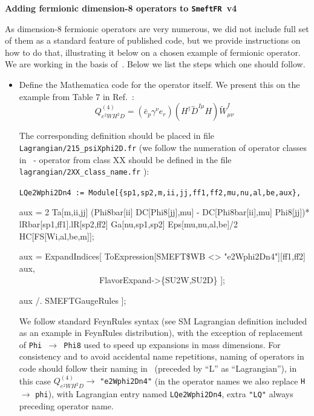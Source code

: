 \documentclass[a4paper,12pt]{article}
\def\sfr{{\tt SmeftFR}~}
\numberwithin{equation}{section}
\begin{document}
\begin{center}
  {\Large \bf Adding fermionic dimension-8 operators to \sfr v4}
\end{center}

As dimension-8 fermionic operators are very numerous, we did not
include full set of them as a standard feature of published code, but
we provide instructions on how to do that, illustrating it below on a
chosen example of fermionic operator.  We are working in the basis
of~\cite{Murphy:2020rsh}.  Below we list the steps which one should
follow.
\begin{itemize}
  \item Define the Mathematica code for the operator itself.  We
    present this on the example from Table 7 in
    Ref.~\cite{Murphy:2020rsh}:
\begin{equation*}
Q_{e^2 W H^2 D}^{(4)}=\left(\bar{e}_p \gamma^\nu
e_r\right)\left(H^{\dagger} \overleftrightarrow{D}^{I \mu} H\right)
\widetilde{W}_{\mu \nu}^I
\end{equation*}

The corresponding definition should be placed in file {\tt
  Lagrangian/215\_psiXphi2D.fr} (we follow the numeration of operator
classes in~\cite{Murphy:2020rsh} - operator from class XX should be
defined in the file {\tt lagrangian/2XX\_class\_name.fr} ):
    
\bigskip
\noindent
    {\small \tt LQe2Wphi2Dn4 :=
      Module[\{sp1,sp2,m,ii,jj,ff1,ff2,mu,nu,al,be,aux\},

    aux = 2 Ta[m,ii,jj] (Phi8bar[ii] DC[Phi8[jj],mu] -
    DC[Phi8bar[ii],mu] Phi8[jj])*\\ lRbar[sp1,ff1].lR[sp2,ff2]
    Ga[nu,sp1,sp2] Eps[mu,nu,al,be]/2 HC[FS[Wi,al,be,m]];
    
    aux = ExpandIndices[ ToExpression[SMEFT\$WB <> "e2Wphi2Dn4"][ff1,ff2] aux,\\
        $\phantom{XXXXXXXXXXX}$
         FlavorExpand->\{SU2W,SU2D\} ];

    aux /. SMEFTGaugeRules ]; }

\bigskip
We follow standard FeynRules syntax (see SM Lagrangian definition
included as an example in FeynRules distribution), with the exception
of replacement of {\tt Phi $\to$ Phi8} used to speed up expansions in
mass dimensions.  For consistency and to avoid accidental name
repetitions, naming of operators in code should follow their naming
in~\cite{Murphy:2020rsh} (preceded by ``L'' as ``Lagrangian''), in
this case $Q_{e^2 W H^2 D}^{(4)}\to$ {\tt "e2Wphi2Dn4"} (in the
operator names we also replace {\tt H} $\to$ {\tt phi}), with
Lagrangian entry named {\tt LQe2Wphi2Dn4}, extra {\tt "LQ"} always
preceding operator name.


\end{itemize}
\end{document}
